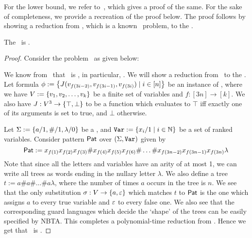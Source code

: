 For the lower bound, we refer to~\cite{matchingProblemLowerBound}, which gives a proof of the same. For the sake of completeness, we provide a recreation of the proof below. The proof follows by showing a reduction from \oneInThreeSatFull, which is a known \npc\ problem\cite{oneInThreeSatIsNpHard}, to the \matchingProblemFull. 

\begin{theorem}\label{thm:matchingProblemLowerBound}
    The \matchingProblemFull\ is \nph.
\end{theorem}

\begin{proof}
    Consider the problem \oneInThreeSatFull\ as given below:
    \begin{problem}
        \problemtitle{\oneInThreeSatFull}
    \end{problem}

    We know from~\cite{oneInThreeSatIsNpHard} that \oneInThreeSatFull\ is \npc, in particular, \nph. We will show a reduction from \oneInThreeSatFull\ to the \matchingProblemFull. Let formula $\phi := \left\{ J(v_{f(3i-2)}, v_{f(3i-1)}, v_{f(3i)}) \mid i \in [n] \right\}$ be an instance of \oneInThreeSatFull, where we have $V := \left\{ v_1, v_2, \dots, v_k \right\}$ be a finite set of variables and $f : [3n] \to [k]$. We also have $J : V^3 \to \left\{ \top, \bot \right\}$ to be a function which evaluates to $\top$ iff exactly one of its arguments is set to true, and $\bot$ otherwise.

    Let $\Sigma := \left\{ a/1, \#/1, \lambda/0 \right\}$ be a \rab, and $\texttt{Var} := \left\{ x_i/1 \mid i \in \mathbb{N} \right\}$ be a set of ranked variables. Consider pattern $\mathsf{Pat}$ over $(\Sigma, \texttt{Var})$ given by
    \[ \mathsf{Pat} := x_{f(1)}x_{f(2)}x_{f(3)}\#x_{f(4)}x_{f(5)}x_{f(6)}\#\dots\#x_{f(3n-2)}x_{f(3n-1)}x_{f(3n)}\lambda \]
    Note that since all the letters and variables have an arity of at most 1, we can write all trees as words ending in the nullary letter $\lambda$. We also define a tree $t := a\#a\#\dots\#a\lambda$, where the number of times $a$ occurs in the tree is $n$. We see that the only substitution $\sigma : V \to \left\{ a, \varepsilon \right\}$ which matches $t$ to $\mathsf{Pat}$ is the one which assigns $a$ to every true variable and $\varepsilon$ to every false one. We also see that the corresponding guard languages which decide the `shape' of the trees can be easily specified by NBTA.
    This completes a polynomial-time reduction from \oneInThreeSatFull. Hence we get that \matchingProblemFull\ is \nph.
\end{proof}

